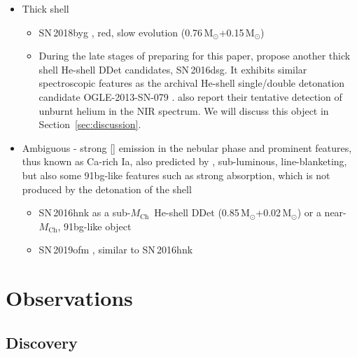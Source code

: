 \documentclass[twocolumn]{aastex631}
\newcommand{\Mch}{$M_\mathrm{Ch}$}
\newcommand{\chang}[1]{\textcolor{blue}{[Chang: #1]}}
\begin{document}
\begin{itemize}
    \item Thick shell
    \begin{itemize}
        \item SN\,2018byg \citep{de_18byg_2019}, red, slow evolution (0.76\,$\mathrm{M_\odot}$+0.15\,$\mathrm{M_\odot}$)
        \item During the late stages of preparing for this paper, \citet{Dong_16dsg_2022} propose another thick shell He-shell DDet candidates, SN\,2016dsg. It exhibits similar spectroscopic features as the archival He-shell single/double detonation candidate OGLE-2013-SN-079 \citep{Dessart_2015, Inserra_OGLE13_079_2015}. \citet{Dong_16dsg_2022} also report their tentative detection of unburnt helium in the NIR spectrum. We will discuss this object in Section~\ref{sec:discussion}.
    \end{itemize}
    \item Ambiguous - strong [] emission in the nebular phase and prominent  features, thus known as Ca-rich Ia, also predicted by \citet{polin_nebular_2021}, sub-luminous, line-blanketing, but also some 91bg-like features such as strong  absorption, which is not produced by the detonation of the shell
    \begin{itemize}
        \item SN\,2016hnk as a sub-\Mch\ He-shell DDet \citep{jacobson-galan_16hnk_2020} (0.85\,$\mathrm{M_\odot}$+0.02\,$\mathrm{M_\odot}$) or a near-\Mch, 91bg-like object \citep{galbany_16hnk_2019}
        \item SN\,2019ofm \citep{de_Ca_rich_2020}, similar to SN\,2016hnk
    \end{itemize}
\end{itemize}
\section{Observations} \label{sec:obs}
\subsection{Discovery}

\end{document}
